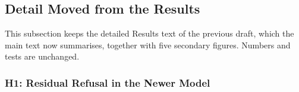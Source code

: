 \subsection{Detail Moved from the Results}
\label{app:moved-results}

This subsection keeps the detailed Results text of the previous draft, which
the main text now summarises, together with five secondary figures. Numbers and
tests are unchanged.

\subsubsection*{H1: Residual Refusal in the Newer Model}

